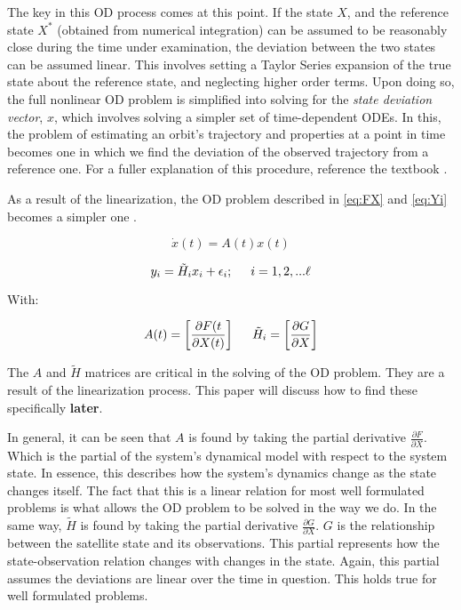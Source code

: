 \documentclass[12pt,a4paper,oneside]{article}
\numberwithin{equation}{section}   		%
\newcommand{\bad}[1]{\color{red}\textbf{#1}\color{black}}
\newcommand{\brackets} [1] {\left[ #1 \right]}
\begin{document}
The key in this OD process comes at this point. If the state $X$, and the reference state $X^*$ (obtained from numerical integration) can be assumed to be reasonably close during the time under examination, the deviation between the two states can be assumed linear. This involves setting a Taylor Series expansion of the true state about the reference state, and neglecting higher order terms. Upon doing so, the full nonlinear OD problem is simplified into solving for the \emph{state deviation vector}, $x$, which involves solving a simpler set of time-dependent ODEs. In this, the problem of estimating an orbit's trajectory and properties at a point in time becomes one in which we find the deviation of the observed trajectory from a reference one. For a fuller explanation of this procedure, reference the textbook \cite[section 4.2]{tapley2004statistical}.

As a result of the linearization, the OD problem described in \eqref{eq:FX} and \eqref{eq:Yi} becomes a simpler one . 

\begin{equation}
	\dot{x}(t) = A(t)x(t)
	\label{eq:x lin}
\end{equation}

\begin{equation}
	y_i = \tilde{H}_ix_i + \epsilon_i ;     \hspace{0.5cm}   i=1,2,...\ell
	\label{eq:y lin}
\end{equation}

With:

\begin{displaymath}
	A(t) = \brackets{\frac{\partial F(t}{\partial X(t)}}
	\hspace{0.5cm}
	\tilde{H}_i = \brackets{\frac{\partial G}{\partial X}}
\end{displaymath}

The $A$ and $\tilde{H}$ matrices are critical in the solving of the OD problem. They are a result of the linearization process. This paper will discuss how to find these specifically \bad{later}. 

In general, it can be seen that $A$ is found by taking the partial derivative $\frac{\partial{F}}{\partial{X}}$. Which is the partial of the system's dynamical model with respect to the system state. In essence, this describes how the system's dynamics change as the state changes itself. The fact that this is a linear relation for most well formulated problems is what allows the OD problem to be solved in the way we do. 
In the same way, $\tilde{H}$ is found by taking the partial derivative $\frac{\partial{G}}{\partial{X}}$. $G$ is the relationship between the satellite state and its observations. This partial represents how the state-observation relation changes with changes in the state. Again, this partial assumes the deviations are linear over the time in question. This holds true for well formulated problems. 
\end{document}
